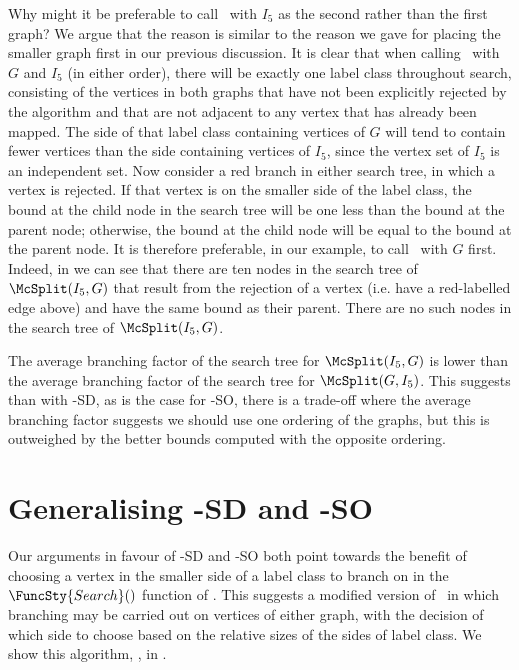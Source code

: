 Why might it be preferable to call \McSplit\ with $I_5$ as the second
rather than the first graph?  We argue
that the reason is similar to the reason we gave for placing the smaller graph
first in our previous discussion.  It is clear that when calling \McSplit\ with
$G$ and $I_5$ (in either order), there will be exactly one label class throughout
search, consisting of the vertices in both graphs that have not been explicitly
rejected by the algorithm and that are not adjacent to any vertex that has already
been mapped.  The side of that label class containing vertices of $G$ will tend to
contain fewer vertices than the side containing vertices of $I_5$, since the vertex set of $I_5$ is
an independent set.  
Now consider a red branch in either search tree, in which a vertex is rejected.
If that vertex is on the smaller side of the label class, the bound at the child node
in the search tree will be one less than the bound at the parent node; otherwise,
the bound at the child node will be equal to the bound at the parent node.  It is
therefore preferable, in our example, to call \McSplit\ with $G$ first.  Indeed,
in  we can see that there are ten
nodes in the search tree of $\McSplit(I_5, G)$ that result from the rejection of
a vertex (i.e. have a red-labelled edge above) and have the same bound as their
parent.  There are no such nodes in the search tree of $\McSplit(I_5, G)$.

The average branching factor of the search tree for $\McSplit(I_5, G)$ is lower
than the average branching factor of the search tree for $\McSplit(G, I_5)$.  This
suggests than with \McSplit-SD, as is the case for \McSplit-SO, there is a trade-off
where the average branching factor suggests we should use one ordering of the
graphs, but this is outweighed by the better bounds computed with the opposite
ordering.

\section{Generalising \McSplit-SD and \McSplit-SO}

Our arguments in favour of \McSplit-SD and \McSplit-SO both point towards the benefit
of choosing a vertex in the smaller side of a label class to branch on in the
$\FuncSty{Search}()$ function of \McSplit.  This suggests a modified version of \McSplit\ in
which branching may be carried out on vertices of either graph, with the decision of
which side to choose based on the relative sizes of the sides of label class.  We
show this algorithm, , in .

